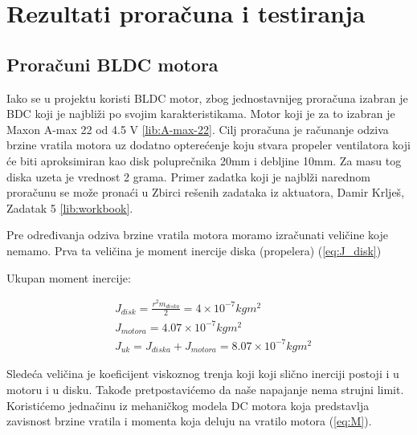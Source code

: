 \documentclass[a4paper, 12pt]{article}
\begin{document}
\endgroup
\pagebreak

\begingroup
\justifying
\section{Rezultati proračuna i testiranja}

\vspace{10pt}


	\subsection{Proračuni BLDC motora }
	
\vspace{10pt}
	
Iako se u projektu koristi BLDC motor, zbog jednostavnijeg proračuna izabran je BDC koji je najbliži po svojim karakteristikama. Motor koji je za to izabran je Maxon A-max 22 od 4.5 V \ref{lib:A-max-22}. Cilj proračuna je računanje odziva brzine vratila motora uz dodatno opterećenje koju stvara propeler ventilatora koji će biti aproksimiran kao disk poluprečnika 20mm i debljine 10mm. Za masu tog diska uzeta je vrednost 2 grama. Primer zadatka koji je najblži narednom proračunu se može pronaći u Zbirci rešenih zadataka iz aktuatora, Damir Krlješ, Zadatak 5 \ref{lib:workbook}.

\vspace{10pt}

Pre određivanja odziva brzine vratila motora moramo izračunati veličine koje nemamo. Prva ta veličina je moment inercije diska (propelera) (\ref{eq:J_disk})

\vspace{10pt}

Ukupan moment inercije:

\begin{align} 
& J_{disk} = \frac{r^2 m_{diska}}{2}=4 \times 10^{-7} kgm^2 \label{eq:J_disk} \\
& J_{motora} = 4.07 \times 10^{-7} kgm^2 \nonumber \\
& J_{uk} = J_{diska} + J_{motora} = 8.07 \times 10^{-7} kgm^2 \nonumber
\end{align}
	
\vspace{10pt}

Sledeća veličina je koeficijent viskoznog trenja koji koji slično inerciji postoji i u motoru i u disku. Takođe pretpostavićemo da naše napajanje nema strujni limit. Koristićemo jednačinu iz mehaničkog modela DC motora koja predstavlja zavisnost brzine vratila i momenta koja deluju na vratilo motora (\ref{eq:M}).
\end{document}
